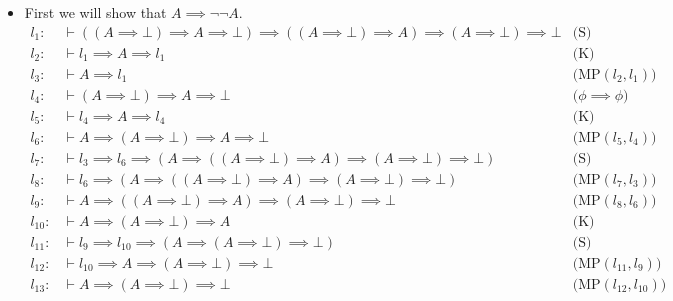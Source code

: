 \begin{itemize}
\begin{itemize}
        \begin{itemize}
            \item[(i)] First we will show that $A \implies \neg \neg A$.
            \begin{align*}
                l_1: &\vdash ((A \implies \bot) \implies A \implies \bot) \implies ((A\implies \bot) \implies A) \implies (A \implies \bot) \implies \bot &\text{(S)} \\
                l_2: &\vdash  l_1 \implies A \implies l_1 &\text{(K)} \\
                l_3: &\vdash A \implies l_1 &\text{(MP$(l_2, l_1)$)} \\
                l_4: &\vdash (A \implies \bot) \implies A \implies \bot &\text{($\phi \implies \phi$)} \\
                l_5: &\vdash l_4 \implies A \implies l_4 &\text{(K)} \\
                l_6: &\vdash A \implies (A \implies \bot) \implies A \implies \bot &\text{(MP$(l_5, l_4)$)} \\
                l_7: &\vdash l_3 \implies l_6 \implies (A \implies ((A \implies \bot) \implies A) \implies (A \implies \bot) \implies \bot) &\text{(S)} \\
                l_8: &\vdash l_6 \implies (A \implies ((A \implies \bot) \implies A) \implies (A \implies \bot) \implies \bot) &\text{(MP$(l_7, l_3)$)} \\
                l_{9}: &\vdash A \implies ((A \implies \bot) \implies A) \implies (A \implies \bot) \implies \bot  &\text{(MP$(l_8, l_6)$)} \\
                l_{10}: &\vdash A \implies (A \implies \bot) \implies A &\text{(K)} \\
                l_{11}: &\vdash l_{9} \implies l_{10} \implies (A \implies (A \implies \bot) \implies \bot)  &\text{(S)} \\
                l_{12}: &\vdash  l_{10} \implies A \implies (A \implies \bot) \implies \bot &\text{(MP$(l_{11}, l_{9})$)} \\
                l_{13}: &\vdash A \implies (A \implies \bot) \implies \bot &\text{(MP$(l_{12}, l_{10})$)} \\
         \end{align*}


\end{itemize}
\end{itemize}
\end{itemize}
